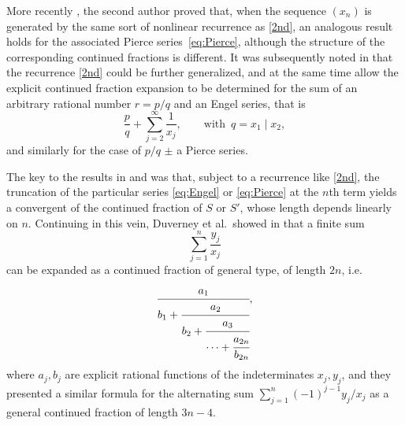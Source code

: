 \documentclass[12pt,a4paper]{amsart}
\theoremstyle{definition}
\numberwithin{equation}{section}
\begin{document}
More recently \cite{Var}, the second 
author proved that, when the sequence $(x_n)$ is generated by the same sort of nonlinear recurrence 
as \eqref{2nd}, 
an analogous result holds for the associated Pierce series~\eqref{eq:Pierce}, 
although the structure of the corresponding continued fractions is different. 
It was subsequently noted in \cite{Hone3, HoneVar} that the recurrence 
\eqref{2nd} could be further generalized, and at the same time allow the 
explicit continued fraction expansion to be determined for the sum 
of an arbitrary rational number $r=p/q$ and an Engel series, that is 
\begin{equation}
\label{pqengel} 
\frac{p}{q} + \sum_{j=2}^\infty \frac{1}{x_j}, \qquad 
\text{with}\,\,\, q=x_1 \mid x_2, 
\end{equation}  
and similarly for the case of $p/q$ $\pm$ a Pierce series.
 
The key to the results in \cite{Hone1, Hone3, HoneVar} and \cite{Var} was that, 
subject to a recurrence like \eqref{2nd}, the truncation of the particular series 
\eqref{eq:Engel} or \eqref{eq:Pierce} %
at the $n$th term yields 
a convergent of the continued fraction of $S$ or $S'$, whose length depends linearly on $n$. 
Continuing in this vein, Duverney et al.\ showed in \cite{DKS1} that a finite sum 
\begin{equation}
\label{yxsum}
\sum_{j=1}^n \frac{y_j}{x_j} 
\end{equation} 
can be expanded as a continued fraction of general type, of length $2n$, i.e.\
\begin{equation}
\label{dks} 
 \cfrac{a_1}{ b_1 + \cfrac{a_2}{ b_2 + \cfrac{a_3}{ \cdots+\cfrac{a_{2n}}{b_{2n}} } } }, 
\end{equation}  
where $a_j,b_j$ are explicit rational functions of the indeterminates $x_j,y_j$, and they presented 
a similar formula for the alternating sum $\sum_{j=1}^n (-1)^{j-1} y_j/x_j$ as a general 
continued fraction of length $3n-4$. 
\end{document}
